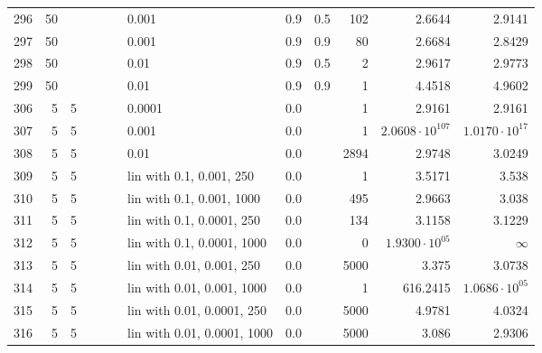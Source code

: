 \begin{longtable}{lrrrrrlrrrrr}
  296 &      50 &   &   &   &   &                       0.001 &      0.9 &    0.5 &     102 &                 2.6644 &                 2.9141 \\
  297 &      50 &   &   &   &   &                       0.001 &      0.9 &    0.9 &      80 &                 2.6684 &                 2.8429 \\
  298 &      50 &   &   &   &   &                        0.01 &      0.9 &    0.5 &       2 &                 2.9617 &                 2.9773 \\
  299 &      50 &   &   &   &   &                        0.01 &      0.9 &    0.9 &       1 &                 4.4518 &                 4.9602 \\
  306 &       5 & 5 &   &   &   &                      0.0001 &      0.0 &        &       1 &                 2.9161 &                 2.9161 \\
  307 &       5 & 5 &   &   &   &                       0.001 &      0.0 &        &       1 & $2.0608\cdot 10^{107}$ &  $1.0170\cdot 10^{17}$ \\
  308 &       5 & 5 &   &   &   &                        0.01 &      0.0 &        &    2894 &                 2.9748 &                 3.0249 \\
  309 &       5 & 5 &   &   &   &    lin with 0.1, 0.001, 250 &      0.0 &        &       1 &                 3.5171 &                  3.538 \\
  310 &       5 & 5 &   &   &   &   lin with 0.1, 0.001, 1000 &      0.0 &        &     495 &                 2.9663 &                  3.038 \\
  311 &       5 & 5 &   &   &   &   lin with 0.1, 0.0001, 250 &      0.0 &        &     134 &                 3.1158 &                 3.1229 \\
  312 &       5 & 5 &   &   &   &  lin with 0.1, 0.0001, 1000 &      0.0 &        &       0 &  $1.9300\cdot 10^{05}$ &               $\infty$ \\
  313 &       5 & 5 &   &   &   &   lin with 0.01, 0.001, 250 &      0.0 &        &    5000 &                  3.375 &                 3.0738 \\
  314 &       5 & 5 &   &   &   &  lin with 0.01, 0.001, 1000 &      0.0 &        &       1 &               616.2415 &  $1.0686\cdot 10^{05}$ \\
  315 &       5 & 5 &   &   &   &  lin with 0.01, 0.0001, 250 &      0.0 &        &    5000 &                 4.9781 &                 4.0324 \\
  316 &       5 & 5 &   &   &   & lin with 0.01, 0.0001, 1000 &      0.0 &        &    5000 &                  3.086 &                 2.9306 \\

\end{longtable}
